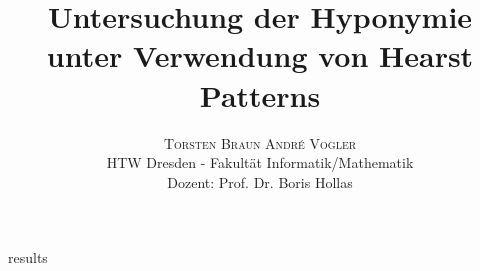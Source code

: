 \documentclass[twoside]{article}
\title{\vspace{-15mm}\fontsize{20pt}{10pt}\selectfont\textbf{Untersuchung der Hyponymie unter Verwendung von Hearst Patterns}}
\author{
\large
\textsc{Torsten Braun \qquad Andr\'{e} Vogler}\\[2mm]
\normalsize HTW Dresden - Fakultät Informatik/Mathematik \\
\normalsize Dozent: Prof. Dr. Boris Hollas
\vspace{-5mm}
}
\date{}
\begin{document}
  \maketitle
  \thispagestyle{fancy}

  

    
    
     {results}

    {}
    
\end{document}
